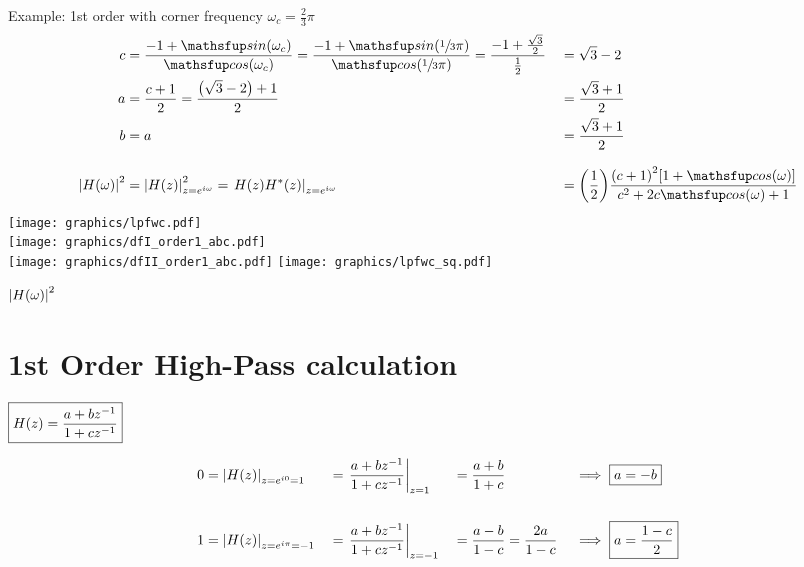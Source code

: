 \newpage
Example: 1st order  with corner frequency $\omega_c=\frac{2}{3}\pi$
\vfill
{\LARGE\begin{align*}
  c &= \frac{-1 + \sin\brp{\omega_c}}{\cos\brp{\omega_c}}
     = \frac{-1 + \sin\brp{\sfrac{1}{3}\pi}}{\cos\brp{\sfrac{1}{3}\pi}}
     = \frac{-1 + \frac{\sqrt{3}}{2}}{\frac{1}{2}}
   &&= \sqrt{3} - 2
  \\
  a &= \frac{c+1}{2}
     = \frac{\brp{\sqrt{3} - 2}+1}{2}
   &&= \frac{\sqrt{3}+1}{2}
  \\
  b &= a
   &&= \frac{\sqrt{3} + 1}{2}
  \\
  \\
  \abs{H(\omega)}^2
    &= \abs{H(z)}^2_{z=e^{i\omega}}
     = \brlr{H(z)H^\ast(z)}_{z=e^{i\omega}}
   &&= \brp{\frac{1}{2}}\frac{\brp{c+1}^2\brs{1 +  \cos\brp{\omega}}}
            {c^2 + 2 c\cos\brp{\omega} + 1}
\end{align*}}
\vfill\newpage
\texttt{[image: graphics/lpfwc.pdf]}\\
\texttt{[image: graphics/dfI\_order1\_abc.pdf]}\\
\texttt{[image: graphics/dfII\_order1\_abc.pdf]}
\vfill
\newpage
\texttt{[image: graphics/lpfwc\_sq.pdf]}

$\displaystyle{\left\lvert H(\omega) \right\rvert}^2$
\newpage
\vfill
\newpage\mbox{}\vfill
{\normalsize

}
\mbox{}\vfill
\newpage
\section{1st Order High-Pass calculation}
$\displaystyle\boxed{ H(z) = \frac{a + bz^{-1}}
                        {1 + cz^{-1}}
          }$

\begin{align*}
  0 &= {{\left\lvert H(z) \right\rvert}}_{z=e^{i0}=1}    
    &&=\left.\frac{a + bz^{-1}}{1 + cz^{-1}}\right|_{z=1} 
    &&=\frac{a + b}{1 + c}                   
    && \implies \boxed{a=-b}
  \\\\
  1 &= {\left\lvert H(z) \right\rvert}_{z=e^{i\pi}=-1} 
   &&= \left.\frac{a + bz^{-1}}{1 + cz^{-1}}\right|_{z=-1} 
   &&= \frac{a - b}{1 - c} = \frac{2a}{1-c}                   
   &&  \implies \boxed{a=\frac{1-c}{2}}
\end{align*}
\vfill\mbox{}

